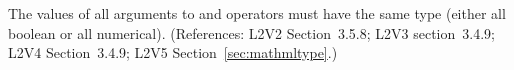 The values of all arguments to  and  operators must
have the same type (either all boolean or all numerical).
(References: L2V2 Section~3.5.8; L2V3 section~3.4.9; L2V4 Section~3.4.9; L2V5
Section~\ref{sec:mathmltype}.)
